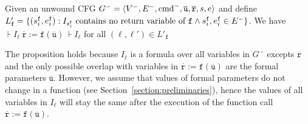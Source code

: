 \begin{proposition}
\label{propposition:invariant}
Given an unwound CFG $G^- = \langle V^-, E^-, \textmd{cmd}^-, \overline{\mathtt{u}}, \overline{\mathtt{r}},s,e \rangle$ and
  define $L'_{\mathtt{{f}}}=\{(s_i^{\mathtt{{f}}},e_i^{\mathtt{{f}}}):
  I_{s_i^{\mathtt{{f}}}} \mbox{ contains no return variable of }\mathtt{{f}} \wedge
  s_i^{\mathtt{{f}}}, e_i^{\mathtt{{f}}}\in E^-\}$.
We have $\assert{I_\ell}\
  \mathtt{\overline{r}} := \mathtt{f}
  (\overline{\mathtt{u}})\ \assert{I_\ell}$ for all $(\ell,\ell')\in L'_\mathtt{f}$
\end{proposition}
The proposition holds because $I_\ell$ is a formula over all variables in $G^-$ excepts $\mathtt{\overline{r}}$ and the only possible overlap with variables in $\mathtt{\overline{r}} := \mathtt{f} (\overline{\mathtt{u}})$ are the formal parameters $\overline{\mathtt{u}}$. However, we assume that values of formal parameters do not change in a function (see Section~\ref{section:preliminaries}), hence the values of all variables in $I_\ell$ will stay the same after the execution of the function call $\mathtt{\overline{r}} := \mathtt{f} (\overline{\mathtt{u}})$.

